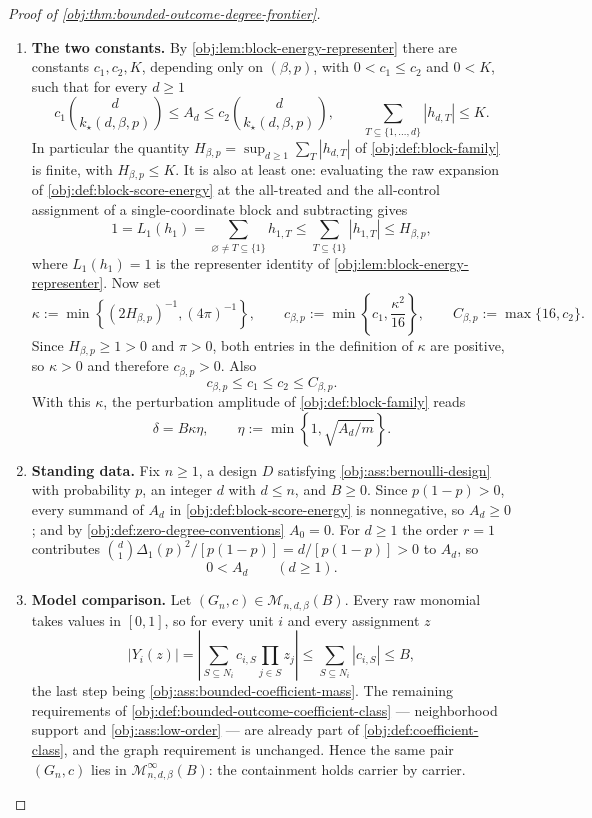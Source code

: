 \documentclass[11pt]{article}
\begin{document}
\begin{proof}[Proof of \cref{obj:thm:bounded-outcome-degree-frontier}]
\begin{enumerate}
\item \textbf{The two constants.}
By \cref{obj:lem:block-energy-representer} there are constants \(c_1,c_2,K\),
depending only on \((\beta,p)\), with \(0<c_1\le c_2\) and \(0<K\), such that for
every \(d\ge 1\)
\[
c_1\binom{d}{k_\star(d,\beta,p)}
\le A_d
\le
c_2\binom{d}{k_\star(d,\beta,p)},
\qquad
\sum_{T\subseteq\{1,\ldots,d\}}|h_{d,T}|\le K .
\]
In particular the quantity \(H_{\beta,p}=\sup_{d\ge1}\sum_T|h_{d,T}|\) of
\cref{obj:def:block-family} is finite, with \(H_{\beta,p}\le K\).  It is also at
least one: evaluating the raw expansion of \cref{obj:def:block-score-energy} at
the all-treated and the all-control assignment of a single-coordinate block and
subtracting gives
\[
1=L_1(h_1)=\sum_{\varnothing\ne T\subseteq\{1\}}h_{1,T}
\le\sum_{T\subseteq\{1\}}|h_{1,T}|\le H_{\beta,p},
\]
where \(L_1(h_1)=1\) is the representer identity of
\cref{obj:lem:block-energy-representer}. Now set
\[
\kappa
:=
\min\!\left\{(2H_{\beta,p})^{-1},(4\pi)^{-1}\right\},
\qquad
c_{\beta,p}
:=
\min\!\left\{c_1,\frac{\kappa^2}{16}\right\},
\qquad
C_{\beta,p}
:=
\max\{16,c_2\}.
\]
Since \(H_{\beta,p}\ge 1>0\) and \(\pi>0\), both entries in the definition of
\(\kappa\) are positive, so \(\kappa>0\) and therefore \(c_{\beta,p}>0\).  Also
\[
c_{\beta,p}\le c_1\le c_2\le C_{\beta,p}.
\]
With this \(\kappa\), the perturbation amplitude of \cref{obj:def:block-family}
reads
\[
\delta
=
B\kappa\eta,
\qquad
\eta:=\min\!\left\{1,\sqrt{A_d/m}\right\}.
\]

\item \textbf{Standing data.}
Fix \(n\ge 1\), a design \(D\) satisfying \cref{obj:ass:bernoulli-design} with
probability \(p\), an integer \(d\) with \(d\le n\), and \(B\ge 0\).  Since
\(p(1-p)>0\), every summand of \(A_d\) in \cref{obj:def:block-score-energy} is
nonnegative, so \(A_d\ge0\); and by \cref{obj:def:zero-degree-conventions}
\(A_0=0\).  For \(d\ge1\) the order \(r=1\) contributes
\(\binom d1\Delta_1(p)^2/[p(1-p)]=d/[p(1-p)]>0\) to \(A_d\), so
\[
0<A_d\qquad (d\ge 1).
\]

\item \textbf{Model comparison.}
Let \((G_n,c)\in\mathcal M_{n,d,\beta}(B)\).  Every raw monomial takes values in
\([0,1]\), so for every unit \(i\) and every assignment \(z\)
\[
|Y_i(z)|
=
\left|\sum_{S\subseteq N_i}c_{i,S}\prod_{j\in S}z_j\right|
\le
\sum_{S\subseteq N_i}|c_{i,S}|
\le B,
\]
the last step being \cref{obj:ass:bounded-coefficient-mass}.  The remaining
requirements of \cref{obj:def:bounded-outcome-coefficient-class} — neighborhood
support and \cref{obj:ass:low-order} — are already part of
\cref{obj:def:coefficient-class}, and the graph requirement is unchanged.  Hence
the same pair \((G_n,c)\) lies in \(\mathcal M_{n,d,\beta}^{\infty}(B)\): the
containment holds carrier by carrier.


\end{enumerate}
\end{proof}
\end{document}
